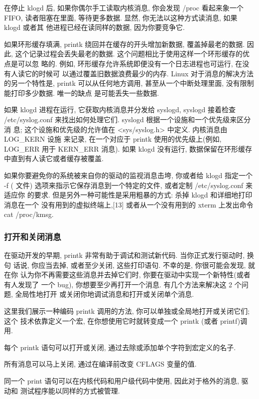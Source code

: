\documentclass[a4paper,titlepage]{article}
\begin{document}
在停止 klogd 后, 如果你偶尔手工读取内核消息, 你会发现 /proc 看起来象一个 FIFO,
读者阻塞在里面, 等待更多数据. 显然, 你无法以这种方式读消息, 如果 klogd 或者其
他进程已经在读同样的数据, 因为你要竞争它.

如果环形缓存填满, printk 绕回并在缓存的开头增加新数据, 覆盖掉最老的数据. 因此,
这个记录过程会丢失最老的数据. 这个问题相比于使用这样一个环形缓存的优点是可以忽
略的. 例如, 环形缓存允许系统即便没有一个日志进程也可运行, 在没有人读它的时候可
以通过覆盖旧数据浪费最少的内存. Linux 对于消息的解决方法的另一个特性是, printk
可以从任何地方调用, 甚至从一个中断处理里面, 没有限制能打印多少数据. 唯一的缺点
是可能丢失一些数据.

如果 klogd 进程在运行, 它获取内核消息并分发给 syslogd, syslogd 接着检查
/etc/syslog.conf 来找出如何处理它们. syslogd 根据一个设施和一个优先级来区分消
息; 这个设施和优先级的允许值在 <sys/syslog.h> 中定义. 内核消息由 LOG_KERN 设施
来记录, 在一个对应于 printk 使用的优先级上(例如, LOG_ERR 用于 KERN_ERR 消息).
如果 klogd 没有运行, 数据保留在环形缓存中直到有人读它或者缓存被覆盖.

如果你要避免你的系统被来自你的驱动的监视消息击垮, 你或者给 klogd 指定一个 -f (
文件) 选项来指示它保存消息到一个特定的文件, 或者定制 /etc/syslog.conf 来适应你
的要求. 但是另外一种可能性是采用粗暴的方式: 杀掉 klogd 和详细地打印消息在一个
没有用到的虚拟终端上,[13] 或者从一个没有用到的 xterm 上发出命令 cat
/proc/kmsg.

\subsubsection{打开和关闭消息} 
在驱动开发的早期, printk 非常有助于调试和测试新代码. 当你正式发行驱动时, 换句
话说, 你应当去掉, 或者至少关闭, 这些打印语句. 不幸的是, 你很可能会发现, 就在你
认为你不再需要这些消息并去掉它们时, 你要在驱动中实现一个新特性(或者有人发现了
一个 bug), 你想要至少再打开一个消息. 有几个方法来解决这 2 个问题, 全局性地打开
或关闭你地调试消息和打开或关闭单个消息.

这里我们展示一种编码 printk 调用的方法, 你可以单独或全局地打开或关闭它们; 这个
技术依靠定义一个宏, 在你想使用它时就转变成一个 printk (或者 printf)调用.

每个 printk 语句可以打开或关闭, 通过去除或添加单个字符到宏定义的名子.

所有消息可以马上关闭, 通过在编译前改变 CFLAGS 变量的值.

同一个 print 语句可以在内核代码和用户级代码中使用, 因此对于格外的消息, 驱动和
测试程序能以同样的方式被管理.
\end{document}
